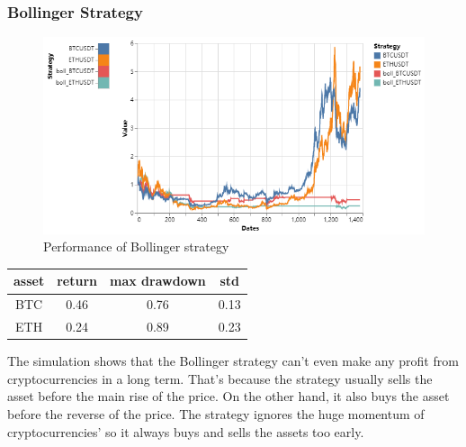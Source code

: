 \documentclass[a4paper]{article}
\begin{document}
\subsubsection{Bollinger Strategy}
\begin{figure}[H]
    \centering
    \includegraphics[scale=0.5]{Q5.png}
    \caption{Performance of Bollinger strategy}
\end{figure}
\begin{table}[H]
    \centering
    \begin{tabular}{@{}|c|c|c|c|@{}}
    \hline
    asset   & return & max drawdown & std \\ \hline
    BTC & 0.46   & 0.76          & 0.13 \\ \hline
    ETH & 0.24   & 0.89         & 0.23  \\ \hline
    \end{tabular}
\end{table}
The simulation shows that the Bollinger strategy can't even make any profit from cryptocurrencies in a long term. That's because the strategy usually sells the asset before the main rise of the price. On the other hand, it also buys the asset before the reverse of the price. The strategy ignores the huge momentum of cryptocurrencies’ so it always buys and sells the assets too early. 
\end{document}
